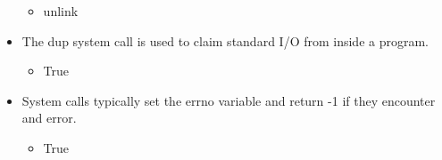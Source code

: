 \documentclass{report}
\begin{document}
\begin{itemize}
\begin{itemize}
                \item unlink
            \end{itemize}
        \item The dup system call is used to claim standard I/O from inside a program.
            \begin{itemize}
                \item True
            \end{itemize}
        \item System calls typically set the errno variable and return -1 if they encounter and error.
            \begin{itemize}
                \item True
            \end{itemize}
    \end{itemize}
\end{document}
